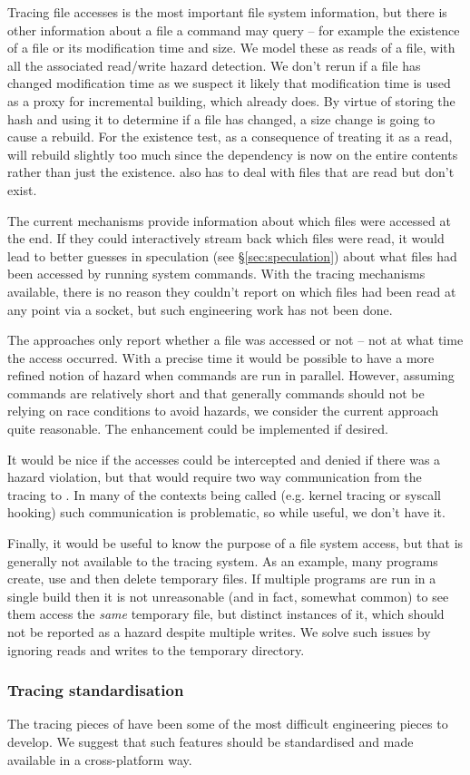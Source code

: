 Tracing file accesses is the most important file system information, but there is other information about a file a command may query -- for example the existence of a file or its modification time and size. We model these as reads of a file, with all the associated read/write hazard detection. %
We don't rerun if a file has changed modification time as we suspect it likely that modification time is used as a proxy for incremental building, which \Rattle already does. By virtue of \Rattle storing the hash and using it to determine if a file has changed, a size change is going to cause a rebuild. For the existence test, as a consequence of treating it as a read, \Rattle will rebuild slightly too much since the dependency is now on the entire contents rather than just the existence.  \Rattle also has to deal with files that are read but don't exist.



The current mechanisms provide information about which files were accessed at the end. If they could interactively stream back which files were read, it would lead to better guesses in speculation (see \S\ref{sec:speculation}) about what files had been accessed by running system commands. With the tracing mechanisms available, there is no reason they couldn't report on which files had been read at any point via a socket, but such engineering work has not been done.

The approaches only report whether a file was accessed or not -- not at what time the access occurred. With a precise time it would be possible to have a more refined notion of hazard when commands are run in parallel. However, assuming commands are relatively short and that generally commands should not be relying on race conditions to avoid hazards, we consider the current approach quite reasonable. The enhancement could be implemented if desired.

It would be nice if the accesses could be intercepted and denied if there was a hazard violation, but that would require two way communication from the tracing to \Rattle. In many of the contexts being called (e.g. kernel tracing or syscall hooking) such communication is problematic, so while useful, we don't have it.

Finally, it would be useful to know the purpose of a file system access, but that is generally not available to the tracing system. As an example, many programs create, use and then delete temporary files. If multiple programs are run in a single \Rattle build then it is not unreasonable (and in fact, somewhat common) to see them access the \emph{same} temporary file, but distinct instances of it, which should not be reported as a hazard despite multiple writes. We solve such issues by ignoring reads and writes to the temporary directory.

\subsubsection{Tracing standardisation}

The tracing pieces of \Rattle have been some of the most difficult engineering pieces to develop. We suggest that such features should be standardised and made available in a cross-platform way.
